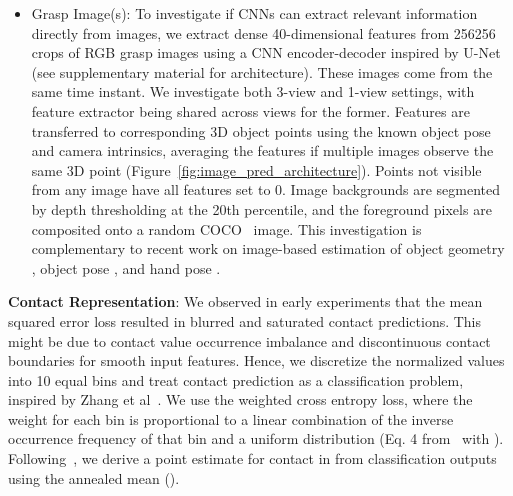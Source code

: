 \documentclass[runningheads]{llncs}
\begin{document}
\begin{itemize}
 \item Grasp Image(s): To investigate if CNNs can extract relevant information directly from images, we extract dense 40-dimensional features from 256256 crops of RGB grasp images using a CNN encoder-decoder inspired by U-Net~\cite{ronneberger2015unet} (see supplementary material for architecture). These images come from the same time instant. We investigate both 3-view and 1-view settings, with feature extractor being shared across views for the former. Features are transferred to corresponding 3D object points using the known object pose and camera intrinsics, averaging the features if multiple images observe the same 3D point (Figure~\ref{fig:image_pred_architecture}). Points not visible from any image have all features set to 0. Image backgrounds are segmented by depth thresholding at the 20th percentile, and the foreground pixels are composited onto a random COCO~\cite{lin2014microsoft} image. This investigation is complementary to recent work on image-based estimation of object geometry \cite{zhou20153d,groueix2018papier}, object pose \cite{garon2017deep,tremblay2018deep}, and hand pose \cite{simon2017hand, Zhang_2019_ICCV, tekin2019h+, Freihand2019,hampali2019ho}.
\end{itemize}

\noindent\textbf{Contact Representation}: We observed in early experiments that the mean squared error loss resulted in blurred and saturated contact predictions. This might be due to contact value occurrence imbalance and discontinuous contact boundaries for smooth input features. Hence, we discretize the  normalized values into 10 equal bins and treat contact prediction as a classification problem, inspired by Zhang et al~\cite{zhang2016colorful}. We use the weighted cross entropy loss, where the weight for each bin is proportional to a linear combination of the inverse occurrence frequency of that bin and a uniform distribution (Eq. 4 from~\cite{zhang2016colorful} with ). Following~\cite{zhang2016colorful}, we derive a point estimate for contact in  from classification outputs using the annealed mean ().
\end{document}
